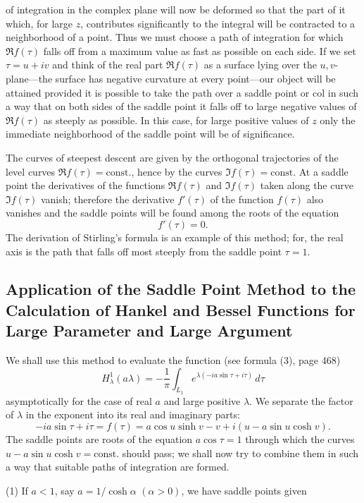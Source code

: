 of integration in the complex plane will now be deformed so that the part of it which, for large $z$, contributes significantly to the integral will be contracted to a neighborhood of a point. Thus we must choose a path of integration for which $\Re f(\tau)$ falls off from a maximum value as fast as possible on each side. If we set $\tau=u+iv$ and think of the real part $\Re f(\tau)$ as a surface lying over the $u,v$-plane---the surface has negative curvature at every point---our object will be attained provided it is possible to take the path over a saddle point or col in such a way that on both sides of the saddle point it falls off to large negative values of $\Re f(\tau)$ as steeply as possible. In this case, for large positive values of $z$ only the immediate neighborhood of the saddle point will be of significance.

The curves of steepest descent are given by the orthogonal trajectories of the level curves $\Re f(\tau)=\mathrm{const.}$, hence by the curves $\Im f(\tau)=\mathrm{const.}$ At a saddle point the derivatives of the functions $\Re f(\tau)$ and $\Im f(\tau)$ taken along the curve $\Im f(\tau)$ vanish; therefore the derivative $f'(\tau)$ of the function $f(\tau)$ also vanishes and the saddle points will be found among the roots of the equation
\[
f'(\tau)=0.
\]
The derivation of Stirling's formula is an example of this method; for, the real axis is the path that falls off most steeply from the saddle point $\tau=1$.

\subsection{Application of the Saddle Point Method to the Calculation of Hankel and Bessel Functions for Large Parameter and Large Argument}
We shall use this method to evaluate the function (see formula (3), page 468)
\[
H_\lambda^1(a\lambda)=-\frac1\pi\int_{L_1}e^{\lambda(-ia\sin\tau+i\tau)}\,d\tau
\]
asymptotically for the case of real $a$ and large positive $\lambda$. We separate the factor of $\lambda$ in the exponent into its real and imaginary parts:
\[
-ia\sin\tau+i\tau=f(\tau)
=a\cos u\sinh v-v+i(u-a\sin u\cosh v).
\]
The saddle points are roots of the equation $a\cos\tau=1$ through which the curves $u-a\sin u\cosh v=\mathrm{const.}$ should pass; we shall now try to combine them in such a way that suitable paths of integration are formed.

(1) If $a<1$, say $a=1/\cosh\alpha$ $(\alpha>0)$, we have saddle points given

